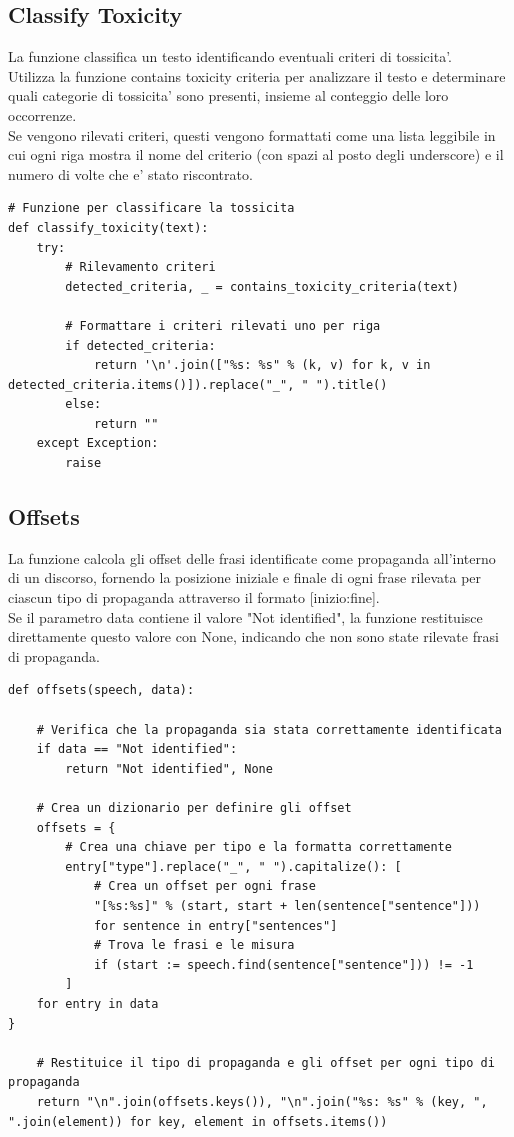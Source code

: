 \documentclass{article}
\begin{document}
		\subsection{Classify Toxicity}
La funzione  classifica un testo identificando eventuali criteri di tossicita'. \\Utilizza la funzione contains toxicity criteria per analizzare il testo e determinare quali categorie di tossicita' sono presenti, insieme al conteggio delle loro occorrenze.\\
Se vengono rilevati criteri, questi vengono formattati come una lista leggibile in cui ogni riga mostra il nome del criterio (con spazi al posto degli underscore) e il numero di volte che e' stato riscontrato.
	\begin{lstlisting}
# Funzione per classificare la tossicita
def classify_toxicity(text):
	try:
		# Rilevamento criteri
		detected_criteria, _ = contains_toxicity_criteria(text)

		# Formattare i criteri rilevati uno per riga
		if detected_criteria:
			return '\n'.join(["%s: %s" % (k, v) for k, v in detected_criteria.items()]).replace("_", " ").title()
		else:
			return ""
	except Exception:
		raise
	\end{lstlisting}
	\newpage
		\subsection{Offsets}	
La funzione calcola gli offset delle frasi identificate come propaganda all'interno di un discorso, fornendo la posizione iniziale e finale di ogni frase rilevata per ciascun tipo di propaganda attraverso il formato [inizio:fine].\\
Se il parametro data contiene il valore "Not identified", la funzione restituisce direttamente questo valore con None, indicando che non sono state rilevate frasi di propaganda.		
	\begin{lstlisting}
def offsets(speech, data):

	# Verifica che la propaganda sia stata correttamente identificata
	if data == "Not identified":
		return "Not identified", None

	# Crea un dizionario per definire gli offset
	offsets = {
		# Crea una chiave per tipo e la formatta correttamente 
		entry["type"].replace("_", " ").capitalize(): [
			# Crea un offset per ogni frase
			"[%s:%s]" % (start, start + len(sentence["sentence"]))
			for sentence in entry["sentences"]
			# Trova le frasi e le misura
			if (start := speech.find(sentence["sentence"])) != -1
		]
	for entry in data
}

	# Restituice il tipo di propaganda e gli offset per ogni tipo di propaganda
	return "\n".join(offsets.keys()), "\n".join("%s: %s" % (key, ", ".join(element)) for key, element in offsets.items())
	\end{lstlisting}
	\newpage
\end{document}
